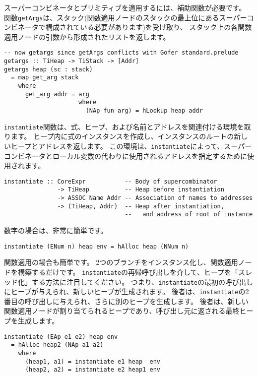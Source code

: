 \documentclass{jarticle}
\begin{document}
スーパーコンビネータとプリミティブを適用するには、補助関数が必要です。
関数\texttt{getArgs}は、スタック(関数適用ノードのスタックの最上位にあるスーパーコンビネータで構成されている必要があります)を受け取り、
スタック上の各関数適用ノードの引数から形成されたリストを返します。

\begin{verbatim}
-- now getargs since getArgs conflicts with Gofer standard.prelude
getargs :: TiHeap -> TiStack -> [Addr]
getargs heap (sc : stack)
  = map get_arg stack
    where
      get_arg addr = arg
                     where
                       (NAp fun arg) = hLookup heap addr
\end{verbatim}

\texttt{instantiate}関数は、式、ヒープ、および名前とアドレスを関連付ける環境を取ります。
ヒープ内に式のインスタンスを作成し、インスタンスのルートの新しいヒープとアドレスを返します。
この環境は、\texttt{instantiate}によって、スーパーコンビネータとローカル変数の代わりに使用されるアドレスを指定するために使用されます。

\begin{verbatim}
instantiate :: CoreExpr           -- Body of supercombinator
               -> TiHeap          -- Heap before instantiation
               -> ASSOC Name Addr -- Association of names to addresses
               -> (TiHeap, Addr)  -- Heap after instantiation,
                                  --   and address of root of instance
\end{verbatim}

数字の場合は、非常に簡単です。

\begin{verbatim}
instantiate (ENum n) heap env = hAlloc heap (NNum n)
\end{verbatim}

関数適用の場合も簡単です。 2つのブランチをインスタンス化し、関数適用ノードを構築するだけです。
\texttt{instantiate}の再帰呼び出しを介して、ヒープを「スレッド化」する方法に注目してください。
つまり、\texttt{instantiate}の最初の呼び出しにヒープが与えられ、新しいヒープが生成されます。
後者は、\texttt{instantiate}の2番目の呼び出しに与えられ、さらに別のヒープを生成します。
後者は、新しい関数適用ノードが割り当てられるヒープであり、呼び出し元に返される最終ヒープを生成します。

\begin{verbatim}
instantiate (EAp e1 e2) heap env
  = hAlloc heap2 (NAp a1 a2)
    where
      (heap1, a1) = instantiate e1 heap  env
      (heap2, a2) = instantiate e2 heap1 env
\end{verbatim}
\end{document}
